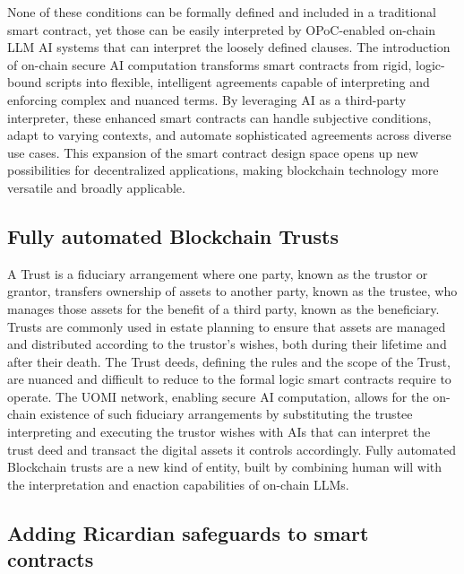 \documentclass{article}
\begin{document}
None of these conditions can be formally defined and included in a traditional smart contract, yet those can be easily interpreted by OPoC-enabled on-chain LLM AI systems that can interpret the loosely defined clauses. The introduction of on-chain secure AI computation transforms smart contracts from rigid, logic-bound scripts into flexible, intelligent agreements capable of interpreting and enforcing complex and nuanced terms. By leveraging AI as a third-party interpreter, these enhanced smart contracts can handle subjective conditions, adapt to varying contexts, and automate sophisticated agreements across diverse use cases. This expansion of the smart contract design space opens up new possibilities for decentralized applications, making blockchain technology more versatile and broadly applicable.



\subsection{Fully automated Blockchain Trusts}

A Trust is a fiduciary arrangement where one party, known as the trustor or grantor, transfers ownership of assets to another party, known as the trustee, who manages those assets for the benefit of a third party, known as the beneficiary. Trusts are commonly used in estate planning to ensure that assets are managed and distributed according to the trustor’s wishes, both during their lifetime and after their death. The Trust deeds, defining the rules and the scope of the Trust, are nuanced and difficult to reduce to the formal logic smart contracts require to operate. The UOMI network, enabling secure AI computation, allows for the on-chain existence of such fiduciary arrangements by substituting the trustee interpreting and executing the trustor wishes with AIs that can interpret the trust deed and transact the digital assets it controls accordingly. Fully automated Blockchain trusts are a new kind of entity, built by combining human will with the interpretation and enaction capabilities of on-chain LLMs. 

\subsection{Adding Ricardian safeguards to smart contracts}
\end{document}
